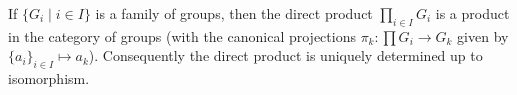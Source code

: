 \begin{theorem}
If $\{G_i \mid i \in I\}$ is a family of groups, then the direct product $\prod_{i \in I} G_i$ is a product in the category of groups (with the canonical projections $\pi_k : \prod G_i \rightarrow G_k$ given by $\{a_i\}_{i \in I} \mapsto a_k$). Consequently the direct product is uniquely determined up to isomorphism.
\end{theorem}
